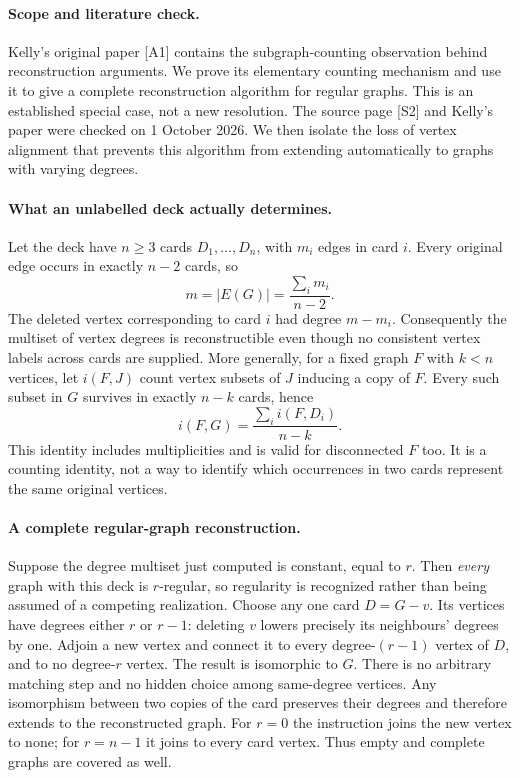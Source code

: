 \documentclass[11pt,a4paper]{article}
\begin{document}
\paragraph{Scope and literature check.}
Kelly's original paper [A1] contains the subgraph-counting observation behind
reconstruction arguments. We prove its elementary counting mechanism and use
it to give a complete reconstruction algorithm for regular graphs. This is
an established special case, not a new resolution. The source page [S2] and
Kelly's paper were checked on 1 October 2026. We then isolate the loss of
vertex alignment that prevents this algorithm from extending automatically
to graphs with varying degrees.

\paragraph{What an unlabelled deck actually determines.}
Let the deck have $n\ge3$ cards $D_1,\ldots,D_n$, with $m_i$ edges in card
$i$. Every original edge occurs in exactly $n-2$ cards, so
\[
                  m=|E(G)|=\frac{\sum_i m_i}{n-2}.
\]
The deleted vertex corresponding to card $i$ had degree $m-m_i$.
Consequently the multiset of vertex degrees is reconstructible even though
no consistent vertex labels across cards are supplied.
More generally, for a fixed graph $F$ with $k<n$ vertices, let $i(F,J)$ count
vertex subsets of $J$ inducing a copy of $F$. Every such subset in $G$
survives in exactly $n-k$ cards, hence
\[
                 i(F,G)=\frac{\sum_i i(F,D_i)}{n-k}.
\]
This identity includes multiplicities and is valid for disconnected $F$ too.
It is a counting identity, not a way to identify which occurrences in two
cards represent the same original vertices.

\paragraph{A complete regular-graph reconstruction.}
Suppose the degree multiset just computed is constant, equal to $r$. Then
\emph{every} graph with this deck is $r$-regular, so regularity is recognized
rather than being assumed of a competing realization. Choose any one card
$D=G-v$. Its vertices have degrees either $r$ or $r-1$: deleting $v$ lowers
precisely its neighbours' degrees by one. Adjoin a new vertex and connect it
to every degree-$(r-1)$ vertex of $D$, and to no degree-$r$ vertex. The result
is isomorphic to $G$. There is no arbitrary matching step and no hidden
choice among same-degree vertices. Any isomorphism between two copies of the
card preserves their degrees and therefore extends to the reconstructed graph.
For $r=0$ the instruction joins the new vertex to none; for $r=n-1$ it joins
to every card vertex. Thus empty and complete graphs are covered as well.
\end{document}
